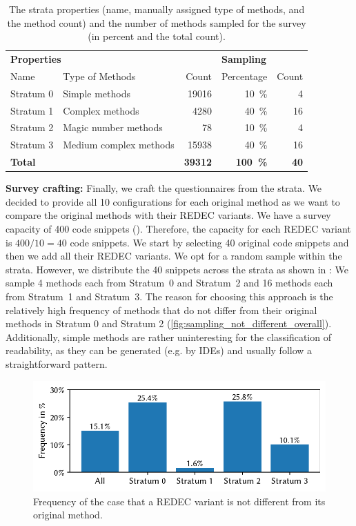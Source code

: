 \documentclass[%
class=scrreprt,
chapterprefix=false,%
open=right,%
twoside=true,%
paper=a4,%
logofile={Logo\_zentral\_farbig\_EN.png},%
thesistype=master,%
UKenglish,%
]{se2thesis}
\theoremstyle{definition}
\newcommand{\numOriginal}{39312\xspace}
\newcommand{\rdh}{REDEC\xspace}
\begin{document}
	\begin{table}[tb]
		\centering
		\caption{The strata properties (name, manually assigned type of methods, and the method count) and the number of methods sampled for the survey (in percent and the total count).}
		\label{tab:strata_info}
		\begin{tabular}{llr|rr}
			\toprule
			\multicolumn{3}{l|}{\textbf{Properties}} & \multicolumn{2}{l}{\textbf{Sampling}} \\
			Name & Type of Methods & Count & Percentage & Count \\
			\midrule
			Stratum 0 & Simple methods & 19016 & 10~\% & 4 \\
			Stratum 1 & Complex methods & 4280 & 40~\% & 16 \\
			Stratum 2 & Magic number methods & 78 & 10~\% & 4 \\
			Stratum 3 & Medium complex methods & 15938 & 40~\% & 16 \\
			\midrule
			\textbf{Total} & & \textbf{\numOriginal} & \textbf{100~\%} & \textbf{40} \\
			\bottomrule
		\end{tabular}
	\end{table}
	
	\textbf{Survey crafting:} Finally, we craft the questionnaires from the strata. We decided to provide all 10 configurations for each original method as we want to compare the original methods with their \rdh variants. We have a survey capacity of 400 code snippets (). Therefore, the capacity for each \rdh variant is $400/10 = 40$ code snippets. We start by selecting 40 original code snippets and then we add all their \rdh variants.
	We opt for a random sample within the strata. However, we distribute the 40 snippets across the strata as shown in :
	We sample 4 methods each from Stratum~0 and Stratum~2 and 16 methods each from Stratum~1 and Stratum~3.
	The reason for choosing this approach is the relatively high frequency of methods that do not differ from their original methods in Stratum 0 and Stratum 2 (\autoref{fig:sampling_not_different_overall}). Additionally, simple methods are rather uninteresting for the classification of readability, as they can be generated (e.g. by IDEs) and usually follow a straightforward pattern.
	
	\begin{figure}[tb]
		\centering
		\includegraphics[width=\textwidth]{img/sampling_not_different_overall_ylim.pdf}
		\caption{Frequency of the case that a \rdh variant is not different from its original method.} 
		\label{fig:sampling_not_different_overall}
	\end{figure}
		
\end{document}
